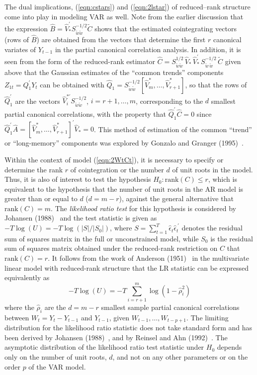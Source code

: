 The dual implications, (\ref{eqn:cstars}) and (\ref{eqn:2lstar}) of reduced--rank structure come into play in modeling VAR as well. Note from the earlier discussion that the expression $\hat{B} = \hat{V}_*^{\prime} S_{\tilde{w} \tilde{w}}^{-1/2} \tilde{C}$ shows that the estimated cointegrating vectors (rows of $\hat{B}$) are obtained from the vectors that determine the first $r$ canonical variates of $Y_{t-1}$ in the partial canonical correlation analysis. In addition, it is seen from the form of the reduced-rank estimator $\hat{C} = S_{\tilde{w} \tilde{w}}^{1/2} \,\hat{V}_* \,\hat{V}_*^{\prime} \,S_{\tilde{w} \,\tilde{w}}^{-1/2} \,\tilde{C}$ given above that the Gaussian estimates of the ``common trends'' components $Z_{1t} = Q_1^{\prime} Y_t$ can be obtained with $\hat{Q}_1 = S_{\tilde{w} \tilde{w}}^{-1/2} [\hat{V}_m^* ,\ldots, \hat{V}_{r+1}^* ]$, so that the rows of $\hat{Q}_1^{\prime}$ are the vectors $\hat{V}_i^{* \prime} S_{\tilde{w} \tilde{w}}^{-1/2}$, $i = r\!+\!1 ,\ldots,m$, corresponding to the $d$ smallest partial canonical correlations, with the property that $\hat{Q}_1^{\prime} \hat{C} = 0$ since $\hat{Q}_1^{\prime} \hat{A} = [\hat{V}_m^* ,\ldots, \hat{V}_{r+1}^* ]^{\prime} \hat{V}_* = 0$. This method of estimation of the common ``trend'' or ``long-memory'' components was explored by Gonzalo and Granger (1995)~\cite{gongra}.


Within the context of model (\ref{eqn:2WtCt}), it is necessary to specify or determine the rank $r$ of cointegration or the number $d$ of unit roots in the model. Thus, it is also of interest to test the hypothesis $H_0\!:\!\mbox{rank} (C) \leq r$, which is equivalent to the hypothesis that the number of unit roots in the AR model is greater than or equal to $d$ ($d = m\!-\!r$), against the general alternative that $\mbox{rank} (C) = m$.  The {\it likelihood ratio test} for this hypothesis is considered by Johansen (1988)~\cite{johansen1988statistical} and the test statistic is given as $- T \log (U) = - T \log ( \left|S \right| / \left| S_0 \right| )$, where $S = \sum_{t=1}^T \hat{\epsilon}_t \hat{\epsilon}_t^{\: \prime} $ denotes the residual sum of squares matrix in the full or unconstrained model, while $S_0 $ is the residual sum of squares matrix obtained under the reduced-rank restriction on $C$ that $\mbox{rank} (C) = r $.  It follows from the work of Anderson (1951)~\cite{andersontw} in the multivariate linear model with reduced-rank structure that the LR statistic can be expressed equivalently as
	\begin{equation}\label{eqn:2negT}
	- T \log (U) = - T \sum_{i=r+1}^m \log ( 1 - \hat{\rho}_i^2 )
	\end{equation}
where the $\hat{\rho}_i$ are the $d = m\!-\!r$ smallest sample partial canonical correlations between $W_t = Y_t - Y_{t-1} $ and $Y_{t-1}$, given $W_{t-1} ,\ldots, W_{t-p+1}$. The limiting distribution for the likelihood ratio statistic does not take standard form and has been derived by Johansen (1988)~\cite{johansen1988statistical}, and by Reinsel and Ahn (1992)~\cite{reinsel1992vector}. The asymptotic distribution of the likelihood ratio test statistic under $H_0$ depends only on the number of unit roots, $d$, and not on any other parameters or on the order $p$ of the VAR model.


